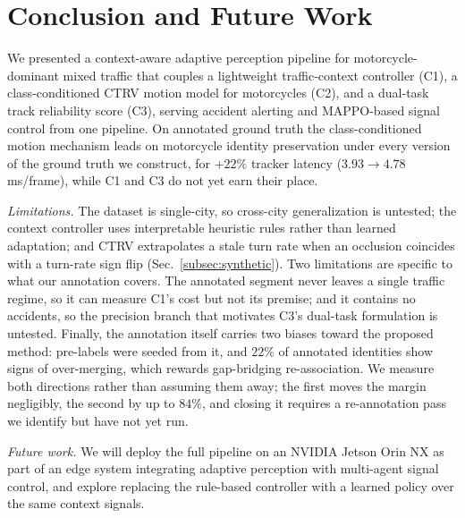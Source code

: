 
\section{Conclusion and Future Work}
\label{sec:conclusion}

We presented a context-aware adaptive perception pipeline for
motorcycle-dominant mixed traffic that couples a lightweight
traffic-context controller (C1), a class-conditioned CTRV motion model
for motorcycles (C2), and a dual-task track reliability score (C3),
serving accident alerting and MAPPO-based signal control from one
pipeline.
On annotated ground truth the class-conditioned motion mechanism leads on
motorcycle identity preservation under every version of the ground truth
we construct, for $+22\%$ tracker latency
($3.93 \rightarrow 4.78$\,ms/frame), while C1 and C3 do not yet earn
their place.

\emph{Limitations.}
The dataset is single-city, so cross-city generalization is untested;
the context controller uses interpretable heuristic rules rather than
learned adaptation; and CTRV extrapolates a stale turn rate when an
occlusion coincides with a turn-rate sign flip
(Sec.~\ref{subsec:synthetic}).
Two limitations are specific to what our annotation covers.
The annotated segment never leaves a single traffic regime, so it can
measure C1's cost but not its premise; and it contains no accidents, so
the precision branch that motivates C3's dual-task formulation is
untested.
Finally, the annotation itself carries two biases toward the proposed
method: pre-labels were seeded from it, and $22\%$ of annotated identities
show signs of over-merging, which rewards gap-bridging re-association.
We measure both directions rather than assuming them away; the first moves
the margin negligibly, the second by up to $84\%$, and closing it requires
a re-annotation pass we identify but have not yet run.

\emph{Future work.}
We will deploy the full pipeline on an NVIDIA Jetson Orin NX as part of
an edge system integrating adaptive perception with multi-agent signal
control, and explore replacing the rule-based controller with a learned
policy over the same context signals.
